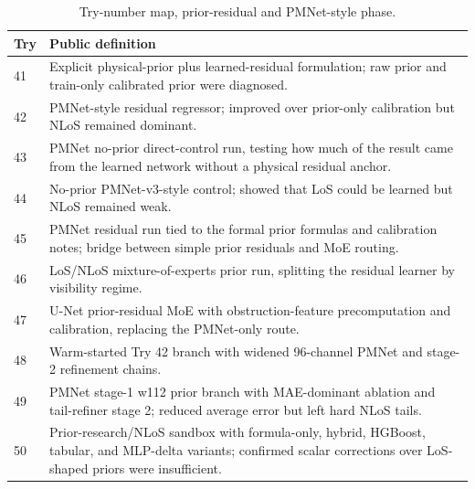 \normalsize

\begin{table}[H]
\centering
\caption{Try-number map, prior-residual and PMNet-style phase.}
\label{tab:try_map_pmnet}
\scriptsize
\renewcommand{\arraystretch}{1.06}
\begin{tabularx}{\textwidth}{p{}>{\raggedright\arraybackslash}X}
\toprule
Try & Public definition \\
\midrule
41 & Explicit physical-prior plus learned-residual formulation; raw prior and train-only calibrated prior were diagnosed. \\
42 & PMNet-style residual regressor; improved over prior-only calibration but NLoS remained dominant. \\
43 & PMNet no-prior direct-control run, testing how much of the result came from the learned network without a physical residual anchor. \\
44 & No-prior PMNet-v3-style control; showed that LoS could be learned but NLoS remained weak. \\
45 & PMNet residual run tied to the formal prior formulas and calibration notes; bridge between simple prior residuals and MoE routing. \\
46 & LoS/NLoS mixture-of-experts prior run, splitting the residual learner by visibility regime. \\
47 & U-Net prior-residual MoE with obstruction-feature precomputation and calibration, replacing the PMNet-only route. \\
48 & Warm-started Try 42 branch with widened 96-channel PMNet and stage-2 refinement chains. \\
49 & PMNet stage-1 w112 prior branch with MAE-dominant ablation and tail-refiner stage 2; reduced average error but left hard NLoS tails. \\
50 & Prior-research/NLoS sandbox with formula-only, hybrid, HGBoost, tabular, and MLP-delta variants; confirmed scalar corrections over LoS-shaped priors were insufficient. \\
\bottomrule
\end{tabularx}
\end{table}
\normalsize

